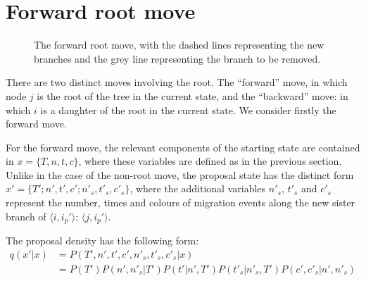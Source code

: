 \documentclass[a4paper,11pt]{article}
\begin{document}
\section{Forward root move}

\begin{figure}
\begin{center}
\end{center}
\caption{The forward root move, with the dashed lines representing
the new branches and the grey line representing the branch to be removed.}
\end{figure}

There are two distinct moves involving the root. The ``forward'' move,
in which node $j$ is the root of the tree in the current state, and
the ``backward'' move: in which $i$ is a daughter of the root in the
current state.  We consider firstly the forward move.

For the forward move, the relevant components of the starting state
are contained in $x=\{T,n,t,c\}$, where these variables are defined as
in the previous section.  Unlike in the case of the non-root move, the
proposal state has the distinct form
$x'=\{T';n',t',c';n'_s,t'_s,c'_s\}$, where the additional variables
$n'_s$, $t'_s$ and $c'_s$  represent the number, times and colours
of migration events along the new sister branch of $\langle
i,i_p'\rangle$: $\langle j,i_p'\rangle$.

The proposal density has the following form:
\begin{align}
  q(x'|x)&=P(T',n',t',c',n'_s,t'_s,c'_s|x)\\
&=P(T')P(n',n'_s|T')P(t'|n',T')P(t'_s|n'_s,T')P(c',c'_s|n',n'_s)\nonumber
\end{align}
\end{document}
